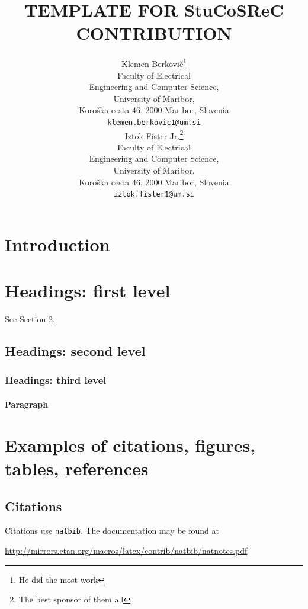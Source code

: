 \documentclass[article,slovene]{stucosrec}
\title{\latex TEMPLATE FOR StuCoSReC CONTRIBUTION}
\author{
	Klemen Berkovi\v{c}\thanks{He did the most work} \\
	Faculty of Electrical \\Engineering and Computer Science,\\
	University of Maribor,\\
	Koro\v{s}ka cesta 46, 2000 Maribor, Slovenia \\
	\texttt{klemen.berkovic1@um.si} \\
	\And
	Iztok Fister Jr.\thanks{The best sponsor of them all} \\
	Faculty of Electrical \\Engineering and Computer Science,\\
	University of Maribor,\\
	Koro\v{s}ka cesta 46, 2000 Maribor, Slovenia \\
	\texttt{iztok.fister1@um.si} \\
}
\begin{document}
	
	\maketitle
	
	\begin{abstract}
		\lipsum[1]
	\end{abstract}
	
	
	\section{Introduction}
	\lipsum[2]
	\lipsum[3]
	
	
	\section{Headings: first level}
	\label{sec:headings}
	
	\lipsum[4] See Section \ref{sec:headings}.
	
	\subsection{Headings: second level}
	\lipsum[5]
	
	\subsubsection{Headings: third level}
	\lipsum[6]
	
	\paragraph{Paragraph}
	\lipsum[7]	
	
	\section{Examples of citations, figures, tables, references}
	\label{sec:others}
	
	\subsection{Citations}
	Citations use \verb+natbib+. The documentation may be found at
	\begin{center}
		\url{http://mirrors.ctan.org/macros/latex/contrib/natbib/natnotes.pdf}
	\end{center}
	
\end{document}
